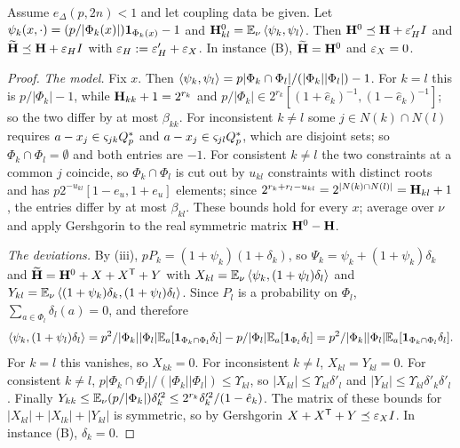 \begin{lemma}\label{lem:spec2:gram}
Assume $e_\Delta(p,2n)<1$ and let coupling data be given. Let
$\psi_k(x,\cdot)=(p/|\Phi_k(x)|)\mathbf 1_{\Phi_k(x)}-1$ and
$\mathbf H^0_{kl}=\mathbb E_\nu\left\langle \psi_k,\psi_l\right\rangle$. Then $\mathbf H^0\preceq\mathbf H+\varepsilon'_HI$ and
$\widetilde{\mathbf H}\preceq\mathbf H+\varepsilon_HI$ with $\varepsilon_H:=\varepsilon'_H+\varepsilon_X$. In instance
\textup{(B)}, $\widetilde{\mathbf H}=\mathbf H^0$ and $\varepsilon_X=0$.
\end{lemma}

\begin{proof}
\emph{The model.} Fix $x$. Then
$\left\langle \psi_k,\psi_l\right\rangle=p|\Phi_k\cap\Phi_l|/(|\Phi_k||\Phi_l|)-1$. For $k=l$ this is
$p/|\Phi_k|-1$, while $\mathbf H_{kk}+1=2^{r_k}$ and
$p/|\Phi_k|\in2^{r_k}[(1+\hat e_k)^{-1},(1-\hat e_k)^{-1}]$; so the two differ by at
most $\beta_{kk}$. For inconsistent $k\ne l$ some $j\in N(k)\cap N(l)$ requires
$a-x_j\in\varsigma_{jk}Q_{p}^{*}$ and $a-x_j\in\varsigma_{jl}Q_{p}^{*}$, which are disjoint
sets; so $\Phi_k\cap\Phi_l=\emptyset$ and both entries are $-1$. For consistent
$k\ne l$ the two constraints at a common $j$ coincide, so $\Phi_k\cap\Phi_l$ is cut
out by $u_{kl}$ constraints with distinct roots and has
$p2^{-u_{kl}}[1-e_u,1+e_u]$ elements; since
$2^{r_k+r_l-u_{kl}}=2^{|N(k)\cap N(l)|}=\mathbf H_{kl}+1$, the entries differ by at
most $\beta_{kl}$. These bounds hold for every $x$; average over $\nu$ and apply
Gershgorin to the real symmetric matrix $\mathbf H^0-\mathbf H$.

\emph{The deviations.} By (iii), $pP_k=(1+\psi_k)(1+\delta_k)$, so
$\Psi_k=\psi_k+(1+\psi_k)\delta_k$ and $\widetilde{\mathbf H}=\mathbf H^0+X+X^{\mathsf T}+Y$ with
$X_{kl}=\mathbb E_\nu\left\langle \psi_k,(1+\psi_l)\delta_l\right\rangle$ and
$Y_{kl}=\mathbb E_\nu\left\langle (1+\psi_k)\delta_k,(1+\psi_l)\delta_l\right\rangle$. Since $P_l$ is a probability
on $\Phi_l$, $\sum_{a\in\Phi_l}\delta_l(a)=0$, and therefore
\[
  \left\langle \psi_k,(1+\psi_l)\delta_l\right\rangle=p^2/|\Phi_k||\Phi_l|\mathbb E_a[\mathbf 1_{\Phi_k\cap\Phi_l}\delta_l]
  -p/|\Phi_l|\mathbb E_a[\mathbf 1_{\Phi_l}\delta_l]
  =p^2/|\Phi_k||\Phi_l|\mathbb E_a[\mathbf 1_{\Phi_k\cap\Phi_l}\delta_l].
\]
For $k=l$ this vanishes, so $X_{kk}=0$. For inconsistent $k\ne l$,
$X_{kl}=Y_{kl}=0$. For consistent $k\ne l$,
$p|\Phi_k\cap\Phi_l|/(|\Phi_k||\Phi_l|)\le\Upsilon_{kl}$, so $|X_{kl}|\le\Upsilon_{kl}\delta'_l$
and $|Y_{kl}|\le\Upsilon_{kl}\delta'_k\delta'_l$. Finally
$Y_{kk}\le\mathbb E_\nu(p/|\Phi_k|)\delta'^2_k\le2^{r_k}\delta'^2_k/(1-\hat e_k)$. The matrix of
these bounds for $|X_{kl}|+|X_{lk}|+|Y_{kl}|$ is symmetric, so by Gershgorin
$X+X^{\mathsf T}+Y\preceq\varepsilon_XI$. In instance (B), $\delta_k=0$.
\end{proof}

